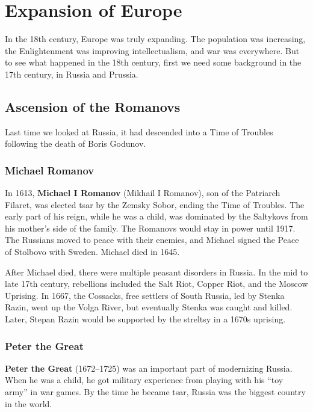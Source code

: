 \chapter{Expansion of Europe}

In the 18th century, Europe was truly expanding.
The population was increasing, the Enlightenment was improving intellectualism, and war was everywhere.
But to see what happened in the 18th century, first we need some background in the 17th century,
in Russia and Prussia.

\section{Ascension of the Romanovs}

Last time we looked at Russia, it had descended into a Time of Troubles following the death of Boris Godunov.

\subsection*{Michael Romanov}

In 1613, \textbf{Michael I Romanov} (Mikhail I Romanov), son of the Patriarch Filaret,
was elected tsar by the Zemsky Sobor, ending the Time of Troubles.
The early part of his reign, while he was a child,
was dominated by the Saltykovs from his mother's side of the family.
The Romanovs would stay in power until 1917.
The Russians moved to peace with their enemies, and Michael signed the Peace of Stolbovo with Sweden.
Michael died in 1645.

After Michael died, there were multiple peasant disorders in Russia.
In the mid to late 17th century, rebellions included the
Salt Riot, Copper Riot, and the Moscow Uprising.
In 1667, the Cossacks, free settlers of South Russia, led by Stenka Razin,
went up the Volga River, but eventually Stenka was caught and killed.
Later, Stepan Razin would be supported by the streltsy in a 1670s uprising.

\subsection*{Peter the Great}

\textbf{Peter the Great} (1672--1725) was an important part of modernizing Russia.
When he was a child, he got military experience from playing with his ``toy army'' in war games.
By the time he became tsar, Russia was the biggest country in the world.

